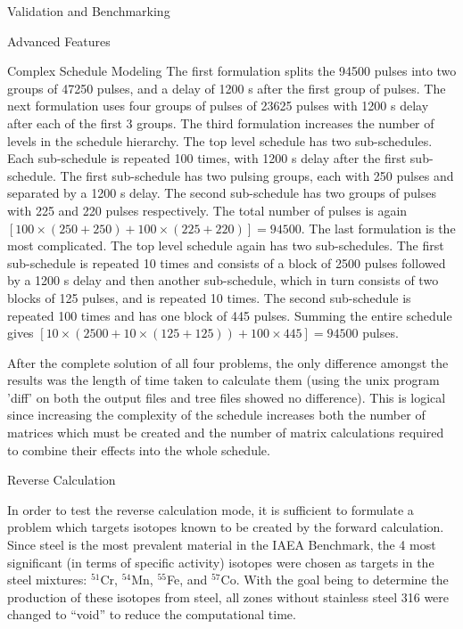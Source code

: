 \begin{chapter}{Validation and Benchmarking}
\begin{section}{Advanced Features}
\begin{subsection}{Complex Schedule Modeling}
      The first formulation splits the 94500 pulses into two groups of
      47250 pulses, and a delay of 1200 s after the first group of
      pulses.  The next formulation uses four groups of pulses of
      23625 pulses with 1200 s delay after each of the first 3 groups.
      The third formulation increases the number of levels in the
      schedule hierarchy.  The top level schedule has two
      sub-schedules.  Each sub-schedule is repeated 100 times, with
      1200 s delay after the first sub-schedule.  The first
      sub-schedule has two pulsing groups, each with 250 pulses and
      separated by a 1200 s delay.  The second sub-schedule has two
      groups of pulses with 225 and 220 pulses respectively.  The
      total number of pulses is again $\left[ 100 \times ( 250 + 250)
        + 100 \times (225 + 220) \right] = 94500$.  The last
      formulation is the most complicated.  The top level schedule
      again has two sub-schedules.  The first sub-schedule is repeated
      10 times and consists of a block of 2500 pulses followed by a
      1200 s delay and then another sub-schedule, which in turn
      consists of two blocks of 125 pulses, and is repeated 10 times.
      The second sub-schedule is repeated 100 times and has one block
      of 445 pulses.  Summing the entire schedule gives $\left[ 10
        \times ( 2500 + 10 \times (125 + 125)) + 100 \times 445\right]
      = 94500$ pulses.
    
      After the complete solution of all four problems, the only
      difference amongst the results was the length of time taken to
      calculate them (using the unix program 'diff' on both the output
      files and tree files showed no difference).  This is logical
      since increasing the complexity of the schedule increases both
      the number of matrices which must be created and the number of
      matrix calculations required to combine their effects into the
      whole schedule.
      
    \end{subsection}
    
    \begin{subsection}{Reverse Calculation}
    
      In order to test the reverse calculation mode, it is sufficient
      to formulate a problem which targets isotopes known to be
      created by the forward calculation.  Since steel is the most
      prevalent material in the IAEA Benchmark, the 4 most significant
      (in terms of specific activity) isotopes were chosen as targets
      in the steel mixtures: $^{51}$Cr, $^{54}$Mn, $^{55}$Fe, and
      $^{57}$Co.  With the goal being to determine the production of
      these isotopes from steel, all zones without stainless steel 316
      were changed to ``void'' to reduce the computational time.
      

\end{subsection}
\end{section}
\end{chapter}
